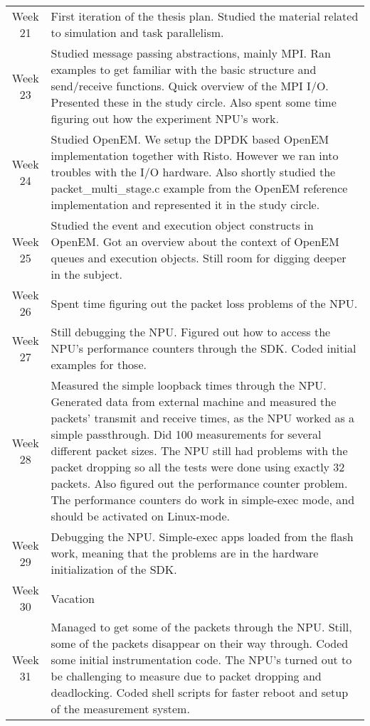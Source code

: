 \begin{center}
  \begin{longtable}{@{}c|p{10cm}@{}}
    \toprule
    Week 21 & First iteration of the thesis plan. Studied the material related to simulation and task parallelism. \\
    Week 23 & Studied message passing abstractions, mainly MPI. Ran examples to get familiar with the basic structure and send/receive functions. Quick overview of the MPI I/O. Presented these in the study circle. Also spent some time figuring out how the experiment NPU's work. \\
    Week 24 & Studied OpenEM. We setup the DPDK based OpenEM implementation together with Risto. However we ran into troubles with the I/O hardware. Also shortly studied the packet\_multi\_stage.c example from the OpenEM reference implementation and represented it in the study circle. \\
    Week 25 & Studied the event and execution object constructs in OpenEM. Got an overview about the context of OpenEM queues and execution objects. Still room for digging deeper in the subject. \\
    Week 26 & Spent time figuring out the packet loss problems of the NPU. \\
    Week 27 & Still debugging the NPU. Figured out how to access the NPU's performance counters through the SDK. Coded initial examples for those. \\
    Week 28 & Measured the simple loopback times through the NPU. Generated data from external machine and measured the packets' transmit and receive times, as the NPU worked as a simple passthrough. Did 100 measurements for several different packet sizes. The NPU still had problems with the packet dropping so all the tests were done using exactly 32 packets. Also figured out the performance counter problem. The performance counters do work in simple-exec mode, and should be activated on Linux-mode.  \\
    Week 29 & Debugging the NPU. Simple-exec apps loaded from the flash work, meaning that the problems are in the hardware initialization of the SDK. \\
    Week 30 & Vacation \\
    Week 31 & Managed to get some of the packets through the NPU. Still, some of the packets disappear on their way through. Coded some initial instrumentation code. The NPU's turned out to be challenging to measure due to packet dropping and deadlocking. Coded shell scripts for faster reboot and setup of the measurement system. \\

\end{longtable}
\end{center}
